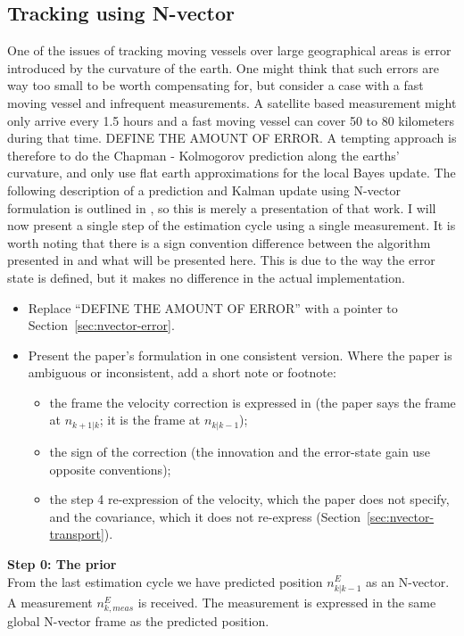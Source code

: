 \subsection{Tracking using N-vector}
\label{sec:tracking_n_vector}
One of the issues of tracking moving vessels over large geographical areas is error introduced by the curvature of the earth. One might think that such errors are way too small to be worth compensating for, but consider a case with a fast moving vessel and infrequent measurements. A satellite based measurement might only arrive every 1.5 hours and a fast moving vessel can cover 50 to 80 kilometers during that time. DEFINE THE AMOUNT OF ERROR. A tempting approach is therefore to do the Chapman - Kolmogorov prediction along the earths' curvature, and only use flat earth approximations for the local Bayes update. The following description of a prediction and Kalman update using N-vector formulation is outlined in \parencite{b_gade_2024}, so this is merely a presentation of that work. I will now present a single step of the estimation cycle using a single measurement. It is worth noting that there is a sign convention difference between the algorithm presented in \parencite{b_gade_2024} and what will be presented here. This is due to the way the error state is defined, but it makes no difference in the actual implementation.
\begin{itemize}
    \item Replace ``DEFINE THE AMOUNT OF ERROR'' with a pointer to Section~\ref{sec:nvector-error}.
    \item Present the paper's formulation in one consistent version. Where the paper is ambiguous or inconsistent, add a short note or footnote:
    \begin{itemize}
        \item the frame the velocity correction is expressed in (the paper says the frame at $n_{k+1|k}$; it is the frame at $n_{k|k-1}$);
        \item the sign of the correction (the innovation and the error-state gain use opposite conventions);
        \item the step 4 re-expression of the velocity, which the paper does not specify, and the covariance, which it does not re-express (Section~\ref{sec:nvector-transport}).
    \end{itemize}
\end{itemize}

\medskip

\textbf{Step 0: The prior} \\
From the last estimation cycle we have predicted position $n^E_{k \vert k-1}$ as an N-vector. A measurement $n^E_{k, meas}$ is received. The measurement is expressed in the same global N-vector frame as the predicted position.

